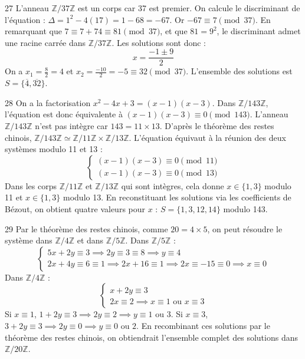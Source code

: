 \begin{correction}{27}
L'anneau $\mathbb{Z}/37\mathbb{Z}$ est un corps car 37 est premier. 
On calcule le discriminant de l'équation : $\Delta = 1^2 - 4(17) = 1 - 68 = -67$. 
Or $-67 \equiv 7 \pmod{37}$. 
En remarquant que $7 \equiv 7+74 \equiv 81 \pmod{37}$, et que $81 = 9^2$, le discriminant admet une racine carrée dans $\mathbb{Z}/37\mathbb{Z}$.
Les solutions sont donc :
$$ x = \frac{-1 \pm 9}{2} $$
On a $x_1 = \frac{8}{2} = 4$ et $x_2 = \frac{-10}{2} = -5 \equiv 32 \pmod{37}$. 
L'ensemble des solutions est $S = \{\overline{4}, \overline{32}\}$. 
\end{correction}

\begin{correction}{28}
On a la factorisation $x^2 - 4x + 3 = (x-1)(x-3)$. 
Dans $\mathbb{Z}/143\mathbb{Z}$, l'équation est donc équivalente à $(x-1)(x-3) \equiv 0 \pmod{143}$. 
L'anneau $\mathbb{Z}/143\mathbb{Z}$ n'est pas intègre car $143 = 11 \times 13$. 
D'après le théorème des restes chinois, $\mathbb{Z}/143\mathbb{Z} \simeq \mathbb{Z}/11\mathbb{Z} \times \mathbb{Z}/13\mathbb{Z}$. 
L'équation équivaut à la réunion des deux systèmes modulo 11 et 13 :
$$ \begin{cases} (x-1)(x-3) \equiv 0 \pmod{11} \\ (x-1)(x-3) \equiv 0 \pmod{13} \end{cases} $$ 
Dans les corps $\mathbb{Z}/11\mathbb{Z}$ et $\mathbb{Z}/13\mathbb{Z}$ qui sont intègres, cela donne $x \in \{1, 3\}$ modulo 11 et $x \in \{1, 3\}$ modulo 13. 
En reconstituant les solutions via les coefficients de Bézout, on obtient quatre valeurs pour $x$ :
$S = \{1, 3, 12, 14\}$ modulo 143. 
\end{correction}

\begin{correction}{29}
Par le théorème des restes chinois, comme $20 = 4 \times 5$, on peut résoudre le système dans $\mathbb{Z}/4\mathbb{Z}$ et dans $\mathbb{Z}/5\mathbb{Z}$. 
Dans $\mathbb{Z}/5\mathbb{Z}$ : 
$$ \begin{cases}5x+2y \equiv 3 \implies 2y \equiv 3 \equiv 8 \implies y \equiv 4 \\ 2x+4y \equiv 6 \equiv 1 \implies 2x + 16 \equiv 1 \implies 2x \equiv -15 \equiv 0 \implies x \equiv 0\end{cases} $$ 
Dans $\mathbb{Z}/4\mathbb{Z}$ : 
$$ \begin{cases} x+2y \equiv 3 \\ 2x \equiv 2 \implies x \equiv 1 \text{ ou } x \equiv 3 \end{cases} $$ 
Si $x \equiv 1$, $1+2y \equiv 3 \implies 2y \equiv 2 \implies y \equiv 1 \text{ ou } 3$.
Si $x \equiv 3$, $3+2y \equiv 3 \implies 2y \equiv 0 \implies y \equiv 0 \text{ ou } 2$.
En recombinant ces solutions par le théorème des restes chinois, on obtiendrait l'ensemble complet des solutions dans $\mathbb{Z}/20\mathbb{Z}$.
\end{correction}

